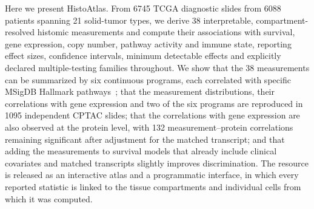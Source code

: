 Here we present HistoAtlas. From \num{6745} TCGA diagnostic slides from
\num{6088} patients spanning 21 solid-tumor types, we derive 38 interpretable,
compartment-resolved histomic measurements and compute their associations with
survival, gene expression, copy number, pathway activity and immune state,
reporting effect sizes, confidence intervals, minimum detectable effects and
explicitly declared multiple-testing families throughout. We show that the 38
measurements can be summarized by six continuous programs, each correlated with
specific MSigDB Hallmark pathways~\cite{liberzon2015}; that the measurement distributions, their
correlations with gene expression and two of the six programs are reproduced in
\num{1095} independent CPTAC slides; that the correlations with gene expression
are also observed at the protein level, with 132 measurement--protein
correlations remaining significant after adjustment for the matched transcript;
and that adding the measurements to survival models that already include
clinical covariates and matched transcripts slightly improves discrimination. The resource is released as an interactive atlas and
a programmatic interface, in which every reported statistic is linked to the
tissue compartments and individual cells from which it was computed.
